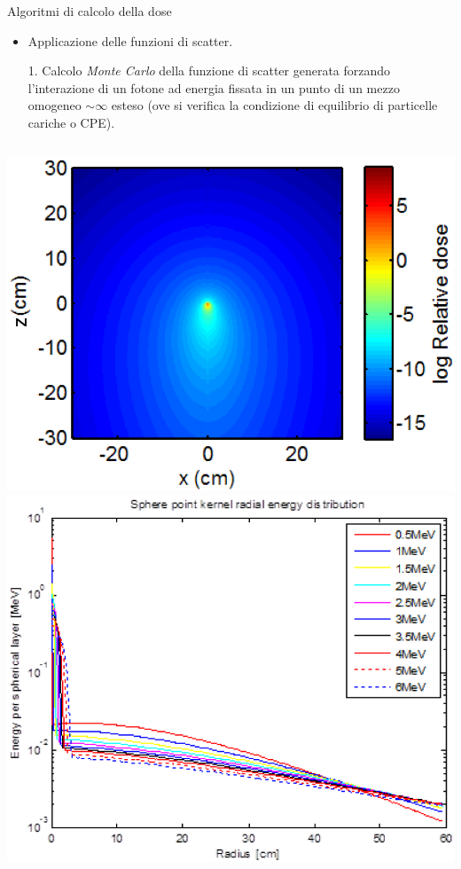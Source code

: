 \documentclass{beamer}
\begin{document}
\begin{frame}{Algoritmi di calcolo della dose}
\scriptsize
\begin{itemize}
\scriptsize
\item \color{red}Applicazione delle funzioni di scatter.
\end{itemize}
\vspace{.2cm}
\scriptsize
\begin{enumerate}
\item[1.] Calcolo \textit{Monte Carlo} della funzione di scatter generata forzando l'interazione di un fotone ad energia fissata in un punto di un mezzo omogeneo $\sim{}\infty$ esteso (ove si verifica la condizione di equilibrio di particelle cariche o CPE).
\end{enumerate}
\begin{columns}
\centering
\includegraphics[width=\textwidth]{../cap1/kern_ray1.png}
\centering
\includegraphics[width=\textwidth]{../cap1/kern_ray2.png}
\end{columns}


\end{frame}
\end{document}
